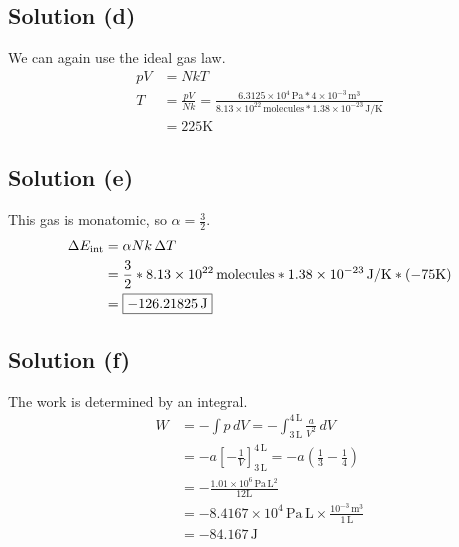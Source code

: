 \documentclass[12pt]{article}
\newcommand{\E}[1]{\times 10^{#1}}
\begin{document}
        \subsection{Solution (d)}
            We can again use the ideal gas law.
            \begin{align}
                pV  &=  NkT\\
                T   &=  \frac{pV}{Nk}
                    =   \frac{6.3125\E{4}\,\unit{\pascal} * 4\E{-3}\,\unit{\meter^3}}{8.13\E{22}\,\text{molecules} * 1.38\E{-23}\,\unit{\joule/\kelvin}}\\
                    &=  \boxed{225\unit{\kelvin}}
            \end{align}

        \subsection{Solution (e)}
            This gas is monatomic, so $\alpha = \frac{3}{2}$.
            \begin{align}
                \Delta E_{\rm int}  &=  \alpha Nk\,\Delta T\\
                    &=  \frac{3}{2} * 8.13\E{22}\,\text{molecules} * 1.38\E{-23}\,\unit{\joule/\kelvin} * (-75\unit{\kelvin})\\
                    &=  \boxed{-126.21825\,\unit{\joule}}
            \end{align}

        \subsection{Solution (f)}
            The work is determined by an integral.
            \begin{align}
                W   &=  -\int p\,dV
                    =   -\int_{3\,\unit{\liter}}^{4\,\unit{\liter}} \frac{a}{V^2}\,dV\\
                    &=  -a \left[ -\frac{1}{V} \right]_{3\,\unit{\liter}}^{4\,\unit{\liter}}
                    =   -a\left( \frac{1}{3} - \frac{1}{4} \right)\\
                    &=  -\frac{1.01\E{6}\,\unit{\pascal\,\liter^2}}{12\unit{\liter}}\\
                    &=  -8.4167\E{4}\,\unit{\pascal\,\liter} \times \frac{10^{-3}\,\unit{\meter^3}}{1\,\unit{\liter}}\\
                    &=  \boxed{-84.167\,\unit{\joule}}
            \end{align}
\end{document}
